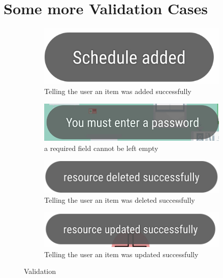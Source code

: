 \documentclass[12pt, oneside, a4paper]{book}
\begin{document}
		\section{Some more Validation Cases}
		\label{appendix:validation}
		\begin{figure}[H]
			\begin{subfigure}[b]{.5\linewidth}
				\includegraphics[width=\linewidth]{img/output_validation_add.jpg}
				\caption{Telling the user an item was added successfully}
			\end{subfigure}
			\begin{subfigure}[b]{.5\linewidth}
				\includegraphics[width=\linewidth]{img/output_validation_empty.jpg}
				\caption{a required field cannot be left empty}
			\end{subfigure}
			\begin{subfigure}[b]{.5\linewidth}
				\includegraphics[width=\linewidth]{img/output_validation_delete.jpg}
				\caption{Telling the user an item was deleted successfully}
			\end{subfigure}
			\begin{subfigure}[b]{.5\linewidth}
				\includegraphics[width=\linewidth]{img/output_validation_update.jpg}
				\caption{Telling the user an item was updated successfully}
			\end{subfigure}
			\caption{Validation}
		\end{figure}
\end{document}
